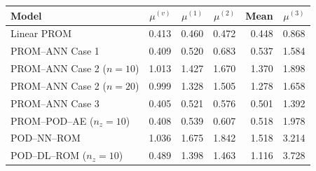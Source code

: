 \begin{tabular}{lrrrrr}
\toprule
Model & $\mu^{(v)}$ & $\mu^{(1)}$ & $\mu^{(2)}$ & Mean & $\mu^{(3)}$ \\
\midrule
Linear PROM & 0.413 & 0.460 & 0.472 & 0.448 & 0.868 \\
PROM--ANN Case 1 & 0.409 & 0.520 & 0.683 & 0.537 & 1.584 \\
PROM--ANN Case 2 ($n=10$) & 1.013 & 1.427 & 1.670 & 1.370 & 1.898 \\
PROM--ANN Case 2 ($n=20$) & 0.999 & 1.328 & 1.505 & 1.278 & 1.658 \\
PROM--ANN Case 3 & 0.405 & 0.521 & 0.576 & 0.501 & 1.392 \\
PROM--POD--AE ($n_z=10$) & 0.408 & 0.539 & 0.607 & 0.518 & 1.978 \\
\midrule
POD--NN--ROM & 1.036 & 1.675 & 1.842 & 1.518 & 3.214 \\
POD--DL--ROM ($n_z=10$) & 0.489 & 1.398 & 1.463 & 1.116 & 3.728 \\
\bottomrule
\end{tabular}
